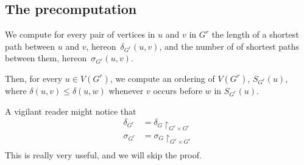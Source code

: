 \subsection{The precomputation}
We compute for every pair of vertices in $u$ and $v$ in $G^r$ the
length of a shortest path between $u$ and $v$, hereon~$\delta_{G^r}(u, v)$,
and the number of of shortest paths between them, hereon~$\sigma_{G^r}(u, v)$.

Then, for every $u \in V(G^r)$, we compute an ordering of $V(G^r)$,
$S_{G^r}(u)$, where $\delta(u, v) \leq \delta(u, w)$ whenever
$v$ occurs before $w$ in $S_{G^r}(u)$.

A vigilant reader might notice that
\begin{align*}
\delta_{G^r} &= \delta_{G}\restriction_{G^r \times G^r}\\
\sigma_{G^r} &= \sigma_{G}\restriction_{G^r \times G^r}\\
\end{align*}
This is really very useful, and we will skip the proof.
